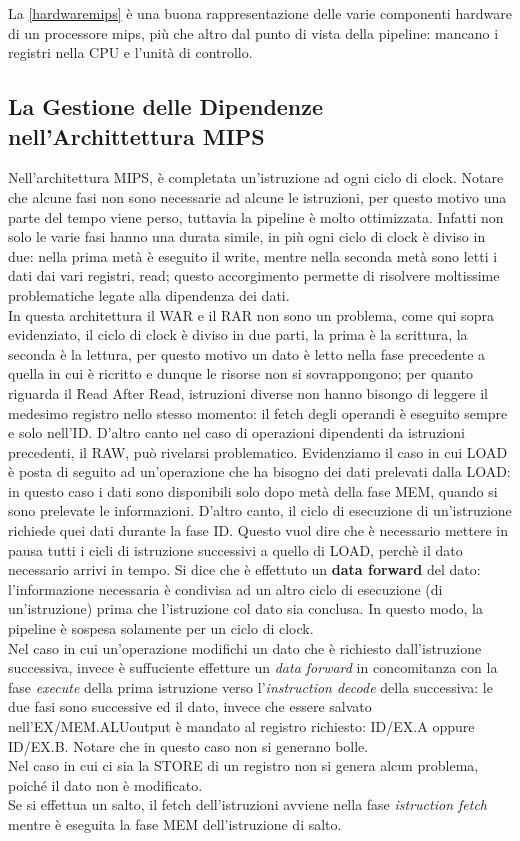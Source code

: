 \documentclass{article}
\begin{document}
La \autoref{hardwaremips} è una buona rappresentazione delle varie componenti hardware di un processore mips, più che altro dal punto di vista della pipeline: mancano i registri nella CPU e l'unità di controllo.

\subsection{La Gestione delle Dipendenze nell'Archittettura MIPS}
Nell'architettura MIPS, è completata un'istruzione ad ogni ciclo di clock. Notare che alcune fasi non sono necessarie ad alcune le istruzioni, per questo motivo una parte del tempo viene perso, tuttavia la pipeline è molto ottimizzata. Infatti non solo le varie fasi hanno una durata simile, in più ogni ciclo di clock è diviso in due: nella prima metà è eseguito il write, mentre nella seconda metà sono letti i dati dai vari registri, read; questo accorgimento permette di risolvere moltissime problematiche legate alla dipendenza dei dati.\\
In questa architettura il WAR e il RAR non sono un problema, come qui sopra evidenziato, il ciclo di clock è diviso in due parti, la prima è la scrittura, la seconda è la lettura, per questo motivo un dato è letto nella fase precedente a quella in cui è ricritto e dunque le risorse non si sovrappongono; per quanto riguarda il Read After Read, istruzioni diverse non hanno bisongo di leggere il medesimo registro nello stesso momento: il fetch degli operandi è eseguito sempre e solo nell'ID. D'altro canto nel caso di operazioni dipendenti da istruzioni precedenti, il RAW, può rivelarsi problematico. Evidenziamo il caso in cui LOAD è posta di seguito ad un'operazione che ha bisogno dei dati prelevati dalla LOAD: in questo caso i dati sono disponibili solo dopo metà della fase MEM, quando si sono prelevate le informazioni. D'altro canto, il ciclo di esecuzione di un'istruzione richiede quei dati durante la fase ID. Questo vuol dire che è necessario mettere in pausa tutti i cicli di istruzione successivi a quello di LOAD, perchè il dato necessario arrivi in tempo. Si dice che è effettuto un \textbf{data forward} del dato: l'informazione necessaria è condivisa ad un altro ciclo di esecuzione (di un'istruzione) prima che l'istruzione col dato sia conclusa. In questo modo, la pipeline è sospesa solamente per un ciclo di clock.\\
Nel caso in cui un'operazione modifichi un dato che è richiesto dall'istruzione successiva, invece è suffuciente effetture un \textit{data forward} in concomitanza con la fase \textit{execute} della prima istruzione verso l'\textit{instruction decode} della successiva: le due fasi sono successive ed il dato, invece che essere salvato nell'EX/MEM.ALUoutput è mandato al registro richiesto: ID/EX.A oppure ID/EX.B. Notare che in questo caso non si generano bolle.\\
Nel caso in cui ci sia la STORE di un registro non si genera alcun problema, poiché il dato non è modificato.\\
Se si effettua un salto, il fetch dell'istruzioni avviene nella fase \textit{istruction fetch} mentre è eseguita la fase MEM dell'istruzione di salto.


%
%

\end{document}
